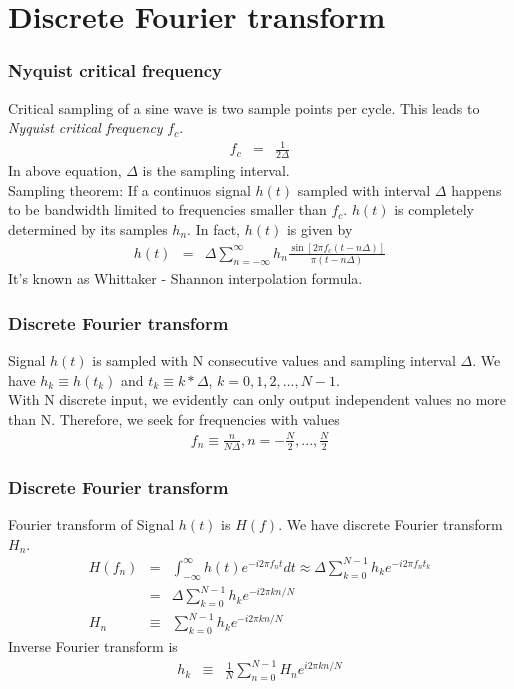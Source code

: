 \documentclass{beamer}
\begin{document}
\section{Discrete Fourier transform}
\begin{frame}
\frametitle{Nyquist critical frequency}
Critical sampling of a sine wave is two sample points per cycle. This leads to \emph{Nyquist critical frequency} $f_c$.
\begin{eqnarray}
f_c &=& \frac{1}{2\Delta}
\label{eq:Nyquist_frequency}
\end{eqnarray}
In above equation, $\Delta$ is the sampling interval. \\
Sampling theorem: If a continuos signal $h(t)$ sampled with interval $\Delta$ happens to be bandwidth limited to frequencies smaller than $f_c$. $h(t)$ is completely determined by its samples $h_n$. In fact, $h(t)$ is given by 
\begin{eqnarray}
h(t) &=& \Delta \sum_{n=-\infty}^{\infty} h_n \frac{\sin [2\pi f_c(t-n\Delta)]}{\pi (t-n\Delta)}
\label{eq:sampling_theorem}
\end{eqnarray}
It's known as Whittaker - Shannon interpolation formula.
\end{frame}
\begin{frame}
\frametitle{Discrete Fourier transform}
Signal $h(t)$ is sampled with N consecutive values and sampling interval $\Delta$. We have $h_k \equiv h(t_k)$ and $t_k \equiv k*\Delta$, $k = 0,1,2,...,N-1$. \\
With N discrete input, we evidently can only output independent values no more than N. Therefore, we seek for frequencies with values
\begin{eqnarray}
f_n \equiv \frac{n}{N\Delta}, n = -\frac{N}{2}, ...,\frac{N}{2}
\label{eq:DFT_Frequencies}
\end{eqnarray}
\end{frame}
\begin{frame}
\frametitle{Discrete Fourier transform}
Fourier transform of Signal $h(t)$ is $H(f)$. We have discrete Fourier transform $H_n$.
\begin{eqnarray}
H(f_n)&=&\int_{-\infty}^{\infty}h(t)e^{-i2\pi f_nt}dt \approx \Delta \sum_{k=0}^{N-1}h_ke^{-i2\pi f_nt_k} \nonumber \\
&=& \Delta \sum_{k=0}^{N-1}h_ke^{-i2\pi kn/N} \nonumber \\
H_n &\equiv& \sum_{k=0}^{N-1}h_ke^{-i2\pi kn/N}
\label{eq:dft}
\end{eqnarray}
Inverse Fourier transform is
\begin{eqnarray}
h_k &\equiv& \frac{1}{N}\sum_{n=0}^{N-1}H_ne^{i2\pi kn/N}
\label{eq:idft}
\end{eqnarray}
\end{frame}
\end{document}
